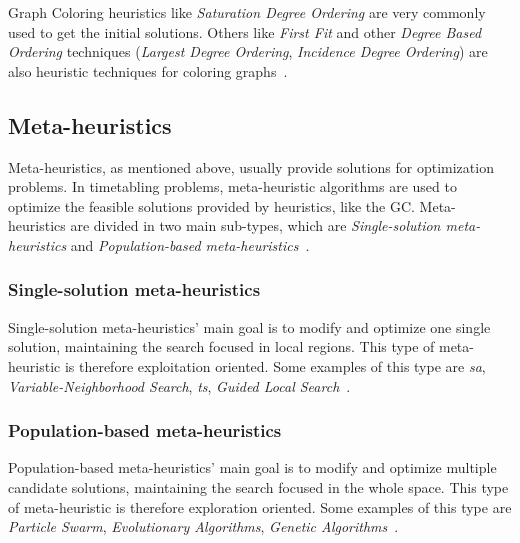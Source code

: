 Graph Coloring heuristics like \textit{Saturation Degree Ordering} are very commonly used to get the initial solutions. Others like \textit{First Fit} and other \textit{Degree Based Ordering} techniques (\textit{Largest Degree Ordering}, \textit{Incidence Degree Ordering}) are also heuristic techniques for coloring graphs~\cite{Carter1996}.\\


\subsection{Meta-heuristics}
Meta-heuristics, as mentioned above, usually provide solutions for optimization problems. In timetabling problems, meta-heuristic algorithms are used to optimize the feasible solutions provided by heuristics, like the GC. Meta-heuristics are divided in two main sub-types, which are \textit{Single-solution meta-heuristics} and \textit{Population-based meta-heuristics}~\cite{Talbi2009}.\\

\subsubsection{Single-solution meta-heuristics}
Single-solution meta-heuristics' main goal is to modify and optimize one single solution, maintaining the search focused in local regions. This type of meta-heuristic is therefore exploitation oriented. Some examples of this type are \textit{\gls{sa}}, \textit{Variable-Neighborhood Search}, \textit{\gls{ts}}, \textit{Guided Local Search}~\cite{Talbi2009}. \\

\subsubsection{Population-based meta-heuristics}
Population-based meta-heuristics' main goal is to modify and optimize multiple candidate solutions, maintaining the search focused in the whole space. This type of meta-heuristic is therefore exploration oriented. Some examples of this type are \textit{Particle Swarm}, \textit{Evolutionary Algorithms}, \textit{Genetic Algorithms}~\cite{Talbi2009}.\\


